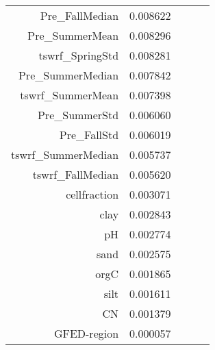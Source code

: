 \begin{tabular}{rrrrr}
Pre_FallMedian & 0.008622 \\
Pre_SummerMean & 0.008296 \\
tswrf_SpringStd & 0.008281 \\
Pre_SummerMedian & 0.007842 \\
tswrf_SummerMean & 0.007398 \\
Pre_SummerStd & 0.006060 \\
Pre_FallStd & 0.006019 \\
tswrf_SummerMedian & 0.005737 \\
tswrf_FallMedian & 0.005620 \\
cellfraction & 0.003071 \\
clay & 0.002843 \\
pH & 0.002774 \\
sand & 0.002575 \\
orgC & 0.001865 \\
silt & 0.001611 \\
CN & 0.001379 \\
GFED-region & 0.000057 \\
\bottomrule
\end{tabular}
